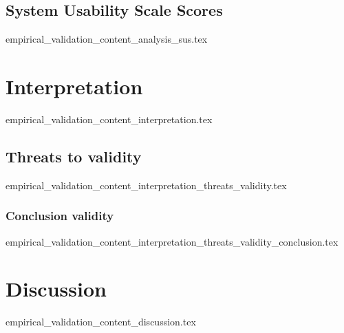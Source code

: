 \subsection{System Usability Scale Scores}
  {empirical_validation_content_analysis_sus.tex}

\section{Interpretation}\label{sub:interpretation}
  {empirical_validation_content_interpretation.tex}

\subsection{Threats to validity}
  {empirical_validation_content_interpretation_threats_validity.tex}

\subsubsection*{Conclusion validity}
  {empirical_validation_content_interpretation_threats_validity_conclusion.tex}

\section{Discussion}
  {empirical_validation_content_discussion.tex}
